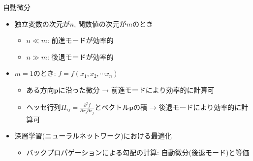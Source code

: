 \begin{frame}[t,fragile]{自動微分}
  \begin{itemize}
  \item 独立変数の次元が$n$, 関数値の次元が$m$のとき
    \begin{itemize}
    \item $n \ll m$: 前進モードが効率的
    \item $n \gg m$: 後退モードが効率的
    \end{itemize}
  \item $m=1$のとき: $f=f(x_1,x_2, \cdots x_n)$
    \begin{itemize}
    \item ある方向$\mathbf{p}$に沿った微分 → 前進モードにより効率的に計算可
    \item ヘッセ行列$\displaystyle H_{ij} = \frac{\partial^2 f}{\partial x_i \partial x_j}$とベクトル$\mathbf{p}$の積 → 後退モードにより効率的に計算可
    \end{itemize}
  \item 深層学習(ニューラルネットワーク)における最適化
    \begin{itemize}
    \item バックプロパゲーションによる勾配の計算: 自動微分(後退モード)と等価
    \end{itemize}
  \end{itemize}
\end{frame}
